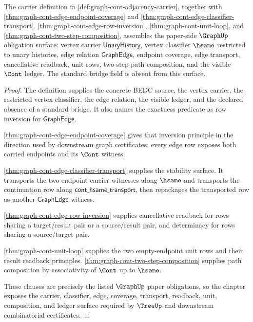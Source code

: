 \begin{theorem}
\label{thm:graph-cont-namecert-surface}
The carrier definition in \autoref{def:graph-cont-adjacency-carrier}, together
with \autoref{thm:graph-cont-edge-endpoint-coverage} and
\autoref{thm:graph-cont-edge-classifier-transport},
\autoref{thm:graph-cont-edge-row-inversion},
\autoref{thm:graph-cont-unit-loop}, and
\autoref{thm:graph-cont-two-step-composition}, assembles the paper-side
$\GraphUp$ obligation surface: vertex carrier $\mathsf{UnaryHistory}$, vertex
classifier $\hsame$ restricted to unary histories, edge relation
$\mathsf{GraphEdge}$, endpoint coverage, edge transport, cancellative readback,
unit rows, two-step path composition, and the visible $\Cont$ ledger. The
standard bridge field is absent from this surface.
\end{theorem}
\begin{proof}
The definition supplies the concrete BEDC source, the vertex carrier, the
restricted vertex classifier, the edge relation, the visible ledger, and the
declared absence of a standard bridge. It also names the exactness predicate as
row inversion for $\mathsf{GraphEdge}$.

\autoref{thm:graph-cont-edge-endpoint-coverage} gives that inversion principle
in the direction used by downstream graph certificates: every edge row exposes
both carried endpoints and its $\Cont$ witness.

\autoref{thm:graph-cont-edge-classifier-transport} supplies the stability
surface. It transports the two endpoint carrier witnesses along $\hsame$ and
transports the continuation row along $\mathsf{cont\_hsame\_transport}$, then
repackages the transported row as another $\mathsf{GraphEdge}$ witness.

\autoref{thm:graph-cont-edge-row-inversion} supplies cancellative readback for
rows sharing a target/result pair or a source/result pair, and determinacy for
rows sharing a source/target pair.

\autoref{thm:graph-cont-unit-loop} supplies the two empty-endpoint unit rows and
their result readback principles. \autoref{thm:graph-cont-two-step-composition}
supplies path composition by associativity of $\Cont$ up to $\hsame$.

These clauses are precisely the listed $\GraphUp$ paper obligations, so the
chapter exposes the carrier, classifier, edge, coverage, transport, readback,
unit, composition, and ledger surface required by $\TreeUp$ and downstream
combinatorial certificates.
\end{proof}

